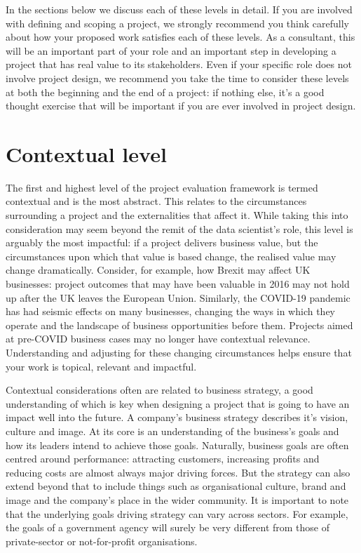 \documentclass[
]{book}
\begin{document}
In the sections below we discuss each of these levels in detail. If you are involved with defining and scoping a project, we strongly recommend you think carefully about how your proposed work satisfies each of these levels. As a consultant, this will be an important part of your role and an important step in developing a project that has real value to its stakeholders. Even if your specific role does not involve project design, we recommend you take the time to consider these levels at both the beginning and the end of a project: if nothing else, it's a good thought exercise that will be important if you are ever involved in project design.

\hypertarget{contextual-level}{%
\section{Contextual level}\label{contextual-level}}

The first and highest level of the project evaluation framework is termed contextual and is the most abstract. This relates to the circumstances surrounding a project and the externalities that affect it. While taking this into consideration may seem beyond the remit of the data scientist's role, this level is arguably the most impactful: if a project delivers business value, but the circumstances upon which that value is based change, the realised value may change dramatically. Consider, for example, how Brexit may affect UK businesses: project outcomes that may have been valuable in 2016 may not hold up after the UK leaves the European Union. Similarly, the COVID-19 pandemic has had seismic effects on many businesses, changing the ways in which they operate and the landscape of business opportunities before them. Projects aimed at pre-COVID business cases may no longer have contextual relevance. Understanding and adjusting for these changing circumstances helps ensure that your work is topical, relevant and impactful.

Contextual considerations often are related to business strategy, a good understanding of which is key when designing a project that is going to have an impact well into the future. A company's business strategy describes it's vision, culture and image. At its core is an understanding of the business's goals and how its leaders intend to achieve those goals. Naturally, business goals are often centred around performance: attracting customers, increasing profits and reducing costs are almost always major driving forces. But the strategy can also extend beyond that to include things such as organisational culture, brand and image and the company's place in the wider community. It is important to note that the underlying goals driving strategy can vary across sectors. For example, the goals of a government agency will surely be very different from those of private-sector or not-for-profit organisations.
\end{document}
